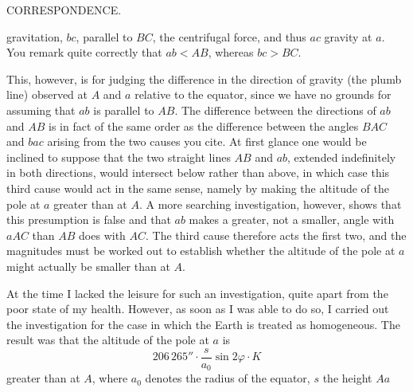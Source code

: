 \clearpage
{}\hfill CORRESPONDENCE.\hfill\mbox{}\par
\noindent gravitation, $bc$, parallel to $BC$, the centrifugal force, and thus $ac$ gravity at $a$. You remark quite correctly that $ab<AB$, whereas $bc>BC$.
\begin{center}
\end{center}
This, however, is  for judging the difference in the direction of gravity (the plumb line) observed at $A$ and $a$ relative to the equator, since we have no grounds for assuming that $ab$ is parallel to $AB$. The difference between the directions of $ab$ and $AB$ is in fact of the same order as the difference between the angles $BAC$ and $bac$ arising from the two causes you cite. At first glance one would be inclined to suppose that the two straight lines $AB$ and $ab$, extended indefinitely in both directions, would intersect below rather than above, in which case this third cause would act in the same sense, namely by making the altitude of the pole at $a$ greater than at $A$. A more searching investigation, however, shows that this presumption is false and that $ab$ makes a greater, not a smaller, angle with $aAC$ than $AB$ does with $AC$. The third cause therefore acts  the first two, and the magnitudes must be worked out to establish whether the altitude of the pole at $a$ might actually be smaller than at $A$.

At the time I lacked the leisure for such an investigation, quite apart from the poor state of my health. However, as soon as I was able to do so, I carried out the investigation for the case in which the Earth is treated as homogeneous. The result was that the altitude of the pole at $a$ is
\[
206\,265''\cdot\frac s{a_0}\sin2\varphi\cdot K
\]
greater than at $A$, where $a_0$ denotes the radius of the equator, $s$ the height $Aa$

